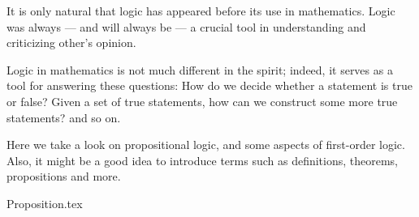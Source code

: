  \label{chap:logic}

It is only natural that
logic has appeared before its use in mathematics.
Logic was always
---
and will always be
---
a crucial tool in understanding and criticizing other's opinion.

Logic in mathematics is not much different in the spirit;
indeed, it serves as a tool for answering these questions:
How do we decide whether a statement is true or false?
Given a set of true statements,
how can we construct some more true statements?
and so on.

Here we take a look on propositional logic,
and some aspects of first-order logic.
Also, it might be a good idea to introduce terms
such as definitions, theorems, propositions and more.

{Proposition.tex}